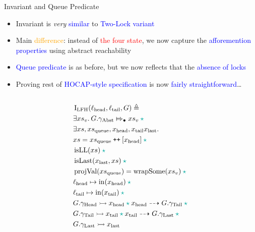 \documentclass[9pt,xcolor={dvipsnames}]{beamer}
\newcommand{\LFQueueInvariantHocap}{\operatorname{I_{LFH}}}
\newcommand{\xsc}{xs}
\newcommand{\xsqueue}{xs_{\mathrm{queue}}}
\newcommand{\isLL}{\operatorname{isLL}}
\newcommand{\projval}{\operatorname{projVal}}
\newcommand{\wrapsome}{\operatorname{wrapSome}}
\newcommand{\isLast}{\operatorname{isLast}}
\newcommand{\locN}[1]{\loc_{\mathrm{#1}}}
\newcommand{\lochead}{\locN{head}}
\newcommand{\loctail}{\locN{tail}}
\newcommand{\nIn}[1]{\operatorname{in}(#1)}
\newcommand{\node}{x}
\newcommand{\nodeN}[1]{\node_{\mathrm{#1}}}
\newcommand{\nodehead}{\nodeN{head}}
\newcommand{\nodetail}{\nodeN{tail}}
\newcommand{\nodelast}{\nodeN{last}}
\newcommand{\absvalueList}{xs_v}
\newcommand{\Qg}{G}
\newcommand{\gabst}{\gname_{\mathrm{Abst}}}
\newcommand{\ghead}{\gname_{\mathrm{Head}}}
\newcommand{\gtail}{\gname_{\mathrm{Tail}}}
\newcommand{\glast}{\gname_{\mathrm{Last}}}
\newcommand\catenate{\mathbin{\text{\ttfamily\upshape ++}}}
\newcommand{\abstractstateauth}[2]{#1 \Mapsto_{\bullet} #2}
\newcommand{\ar}[2]{#1 \dashrightarrow #2}
\newcommand{\ap}[2]{#1 \rightarrowtail #2}
\let\oldstar\star
\renewcommand{\star}{\begingroup \color{Emerald} \oldstar \endgroup}
\begin{document}
\begin{frame}{Invariant and Queue Predicate}
  \begin{itemize}
    \item Invariant is \textit{very} \textcolor{blue}{similar} to \textcolor{blue}{Two-Lock variant}
    \item Main \textcolor{orange}{difference}: instead of \textcolor{red}{the four state}, we now capture the \textcolor{blue}{afforemention properties} using abstract reachability
    \item \textcolor{blue}{Queue predicate} is as before, but we now reflects that the \textcolor{blue}{absence of locks}
    \item Proving rest of \textcolor{blue}{HOCAP-style specification} is now \textcolor{blue}{fairly straightforward}\dots
  \end{itemize}
  \vspace{-12pt}
  \begin{columns}[t]
    \begin{column}{0.5\textwidth}
      \begin{definition}[Invariant]\label{LFMSQSPECS:pred:invariant}
        \setlength\abovedisplayskip{0pt}
        \setlength\belowdisplayskip{2pt}
        \fontsize{7pt}{4pt}\selectfont
        \begin{align*}
          &\LFQueueInvariantHocap(\lochead, \loctail, \Qg) \eqdef\\
          &\Exists \absvalueList. \abstractstateauth{\Qg.\gabst}{\absvalueList} \star{}\\
          &\Exists \xsc, \xsqueue, \nodehead, \nodetail \nodelast .\\
          &\xsc = \xsqueue \catenate [\nodehead] \star{}\\
          &\isLL(\xsc) \star{}\\
          &\isLast(\nodelast, \xsc) \star{}\\
          &\projval(\xsqueue) = \wrapsome(\absvalueList) \star{}\\
          &\lochead \mapsto \nIn{\nodehead} \star{}\\
          &\loctail \mapsto \nIn{\nodetail} \star{}\\
          &\ap{\Qg.\ghead}{\nodehead} \star{} \ar{\nodehead}{\Qg.\gtail} \star{}\\
          &\ap{\Qg.\gtail}{\nodetail} \star{} \ar{\nodetail}{\Qg.\glast} \star{}\\
          &\ap{\Qg.\glast}{\nodelast}

\end{align*}
\end{definition}
\end{column}
\end{columns}
\end{frame}
\end{document}
